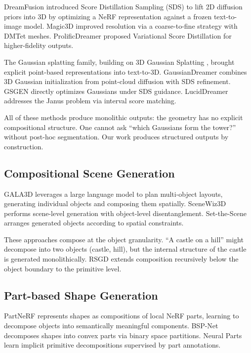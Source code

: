 \documentclass[11pt]{article}
\begin{document}
DreamFusion \cite{poole2023} introduced Score Distillation Sampling (SDS) to lift 2D diffusion priors into 3D by optimizing a NeRF representation against a frozen text-to-image model. Magic3D \cite{lin2023} improved resolution via a coarse-to-fine strategy with DMTet meshes. ProlificDreamer \cite{wang2024} proposed Variational Score Distillation for higher-fidelity outputs.

The Gaussian splatting family, building on 3D Gaussian Splatting \cite{kerbl2023}, brought explicit point-based representations into text-to-3D. GaussianDreamer \cite{yi2024} combines 3D Gaussian initialization from point-cloud diffusion with SDS refinement. GSGEN \cite{chen2024gsgen} directly optimizes Gaussians under SDS guidance. LucidDreamer \cite{liang2024lucid} addresses the Janus problem via interval score matching.

All of these methods produce monolithic outputs: the geometry has no explicit compositional structure. One cannot ask ``which Gaussians form the tower?'' without post-hoc segmentation. Our work produces structured outputs by construction.

\subsection{Compositional Scene Generation}

GALA3D \cite{zhou2024} leverages a large language model to plan multi-object layouts, generating individual objects and composing them spatially. SceneWiz3D \cite{zhang2024scenewiz3d} performs scene-level generation with object-level disentanglement. Set-the-Scene \cite{cohenbar2023} arranges generated objects according to spatial constraints.

These approaches compose at the object granularity. ``A castle on a hill'' might decompose into two objects (castle, hill), but the internal structure of the castle is generated monolithically. RSGD extends composition recursively below the object boundary to the primitive level.

\subsection{Part-based Shape Generation}

PartNeRF \cite{tertikas2023} represents shapes as compositions of local NeRF parts, learning to decompose objects into semantically meaningful components. BSP-Net \cite{chen2020} decomposes shapes into convex parts via binary space partitions. Neural Parts \cite{paschalidou2021} learn implicit primitive decompositions supervised by part annotations.
\end{document}
